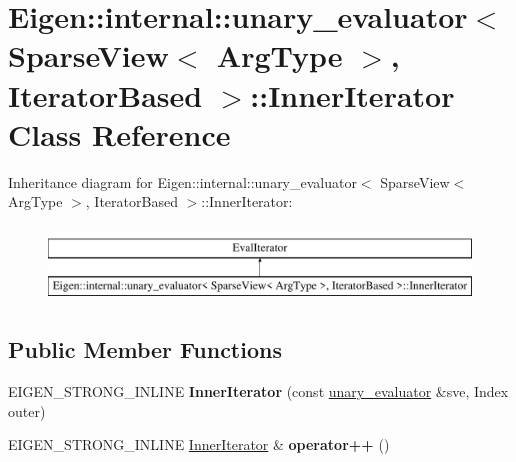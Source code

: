 \hypertarget{class_eigen_1_1internal_1_1unary__evaluator_3_01_sparse_view_3_01_arg_type_01_4_00_01_iterator_based_01_4_1_1_inner_iterator}{}\section{Eigen\+::internal\+::unary\+\_\+evaluator$<$ Sparse\+View$<$ Arg\+Type $>$, Iterator\+Based $>$\+::Inner\+Iterator Class Reference}
\label{class_eigen_1_1internal_1_1unary__evaluator_3_01_sparse_view_3_01_arg_type_01_4_00_01_iterator_based_01_4_1_1_inner_iterator}
Inheritance diagram for Eigen\+::internal\+::unary\+\_\+evaluator$<$ Sparse\+View$<$ Arg\+Type $>$, Iterator\+Based $>$\+::Inner\+Iterator\+:\begin{figure}[H]
\begin{center}
\leavevmode
\includegraphics[height=2.000000cm]{class_eigen_1_1internal_1_1unary__evaluator_3_01_sparse_view_3_01_arg_type_01_4_00_01_iterator_based_01_4_1_1_inner_iterator}
\end{center}
\end{figure}
\subsection*{Public Member Functions}
\begin{DoxyCompactItemize}
\item 
\mbox{\label{class_eigen_1_1internal_1_1unary__evaluator_3_01_sparse_view_3_01_arg_type_01_4_00_01_iterator_based_01_4_1_1_inner_iterator_aabcc7bf315b6f4b07caaebf95c49ae16}} 
E\+I\+G\+E\+N\+\_\+\+S\+T\+R\+O\+N\+G\+\_\+\+I\+N\+L\+I\+NE {\bfseries Inner\+Iterator} (const \mbox{\hyperlink{struct_eigen_1_1internal_1_1unary__evaluator}{unary\+\_\+evaluator}} \&sve, Index outer)
\item 
\mbox{\label{class_eigen_1_1internal_1_1unary__evaluator_3_01_sparse_view_3_01_arg_type_01_4_00_01_iterator_based_01_4_1_1_inner_iterator_a2b41f799808167ed9710cd582f0fd011}} 
E\+I\+G\+E\+N\+\_\+\+S\+T\+R\+O\+N\+G\+\_\+\+I\+N\+L\+I\+NE \mbox{\hyperlink{class_eigen_1_1_inner_iterator}{Inner\+Iterator}} \& {\bfseries operator++} ()
\end{DoxyCompactItemize}
